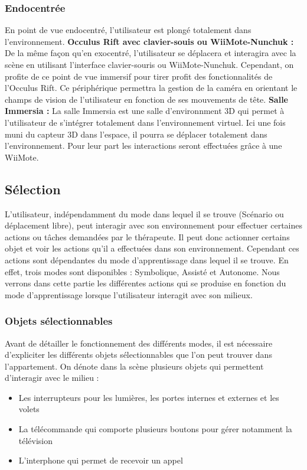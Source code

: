 \subsubsection{Endocentrée}
En point de vue endocentré, l’utilisateur est plongé totalement dans l’environnement.
\newline
\textbf{Occulus Rift avec clavier-souis ou WiiMote-Nunchuk : }
De la même façon qu’en exocentré, l’utilisateur se déplacera et interagira avec la scène en utilisant l’interface clavier-souris ou WiiMote-Nunchuk. Cependant, on profite de ce point de vue immersif pour tirer profit des fonctionnalités de l’Occulus Rift.
Ce périphérique permettra la gestion de la caméra en orientant le champs de vision de l’utilisateur en fonction de ses mouvements de tête.
\newline
\textbf{Salle Immersia : }
La salle Immersia est une salle d’environnment 3D qui permet à l’utilisateur de s’intégrer totalement dans l’environnement virtuel. Ici une fois muni du capteur 3D dans l'espace, il pourra se déplacer totalement dans l’environnement.
Pour leur part les interactions seront effectuées grâce à une WiiMote.

\subsection{Sélection}

L'utilisateur, indépendamment du mode dans lequel il se trouve (Scénario ou déplacement libre), peut interagir avec son environnement pour effectuer certaines actions ou tâches demandées par le thérapeute. Il peut donc actionner certains objet et voir les actions qu'il a effectuées dans son environnement. Cependant ces actions sont dépendantes du mode d'apprentissage dans lequel il se trouve. En effet, trois modes sont disponibles : Symbolique, Assisté et Autonome. Nous verrons dans cette partie les différentes actions qui se produise en fonction du mode d'apprentissage lorsque l'utilisateur interagit avec son milieux.

\subsubsection{Objets sélectionnables}

Avant de détailler le fonctionnement des différents modes, il est nécessaire d'expliciter les différents objets sélectionnables que l'on peut trouver dans l'appartement. On dénote dans la scène plusieurs objets qui permettent d'interagir avec le milieu :
\begin{itemize}
	\item Les interrupteurs pour les lumières, les portes internes et externes et les volets
	\item La télécommande qui comporte plusieurs boutons pour gérer notamment la télévision
	\item L'interphone qui permet de recevoir un appel
\end{itemize}

